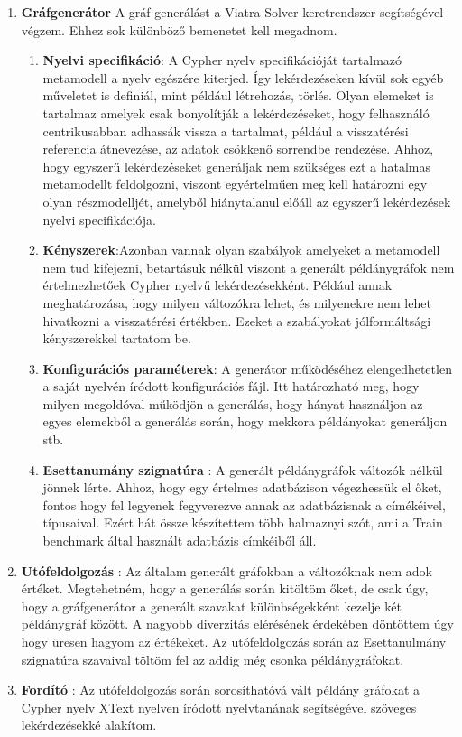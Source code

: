 \begin{enumerate}
	\item \textbf{Gráfgenerátor}
	A gráf generálást a Viatra Solver keretrendszer  segítségével végzem. Ehhez sok különböző bemenetet kell megadnom. 
	\begin{enumerate}
		\item\textbf{Nyelvi specifikáció}: A Cypher nyelv specifikációját tartalmazó metamodell a nyelv egészére kiterjed. Így lekérdezéseken kívül sok egyéb műveletet is definiál, mint például létrehozás, törlés. Olyan elemeket is tartalmaz amelyek csak bonyolítják a lekérdezéseket, hogy felhasználó centrikusabban adhassák vissza a tartalmat, például a visszatérési referencia átnevezése, az adatok csökkenő sorrendbe rendezése. Ahhoz, hogy egyszerű lekérdezéseket generáljak nem szükséges ezt a hatalmas metamodellt feldolgozni, viszont egyértelműen meg kell határozni egy olyan részmodelljét, amelyből hiánytalanul előáll az egyszerű lekérdezések nyelvi specifikációja. 
		\item\textbf{Kényszerek}:Azonban vannak	olyan szabályok amelyeket a metamodell nem tud kifejezni, betartásuk nélkül viszont a generált példánygráfok nem értelmezhetőek Cypher nyelvű lekérdezésekként. Például annak meghatározása, hogy milyen változókra lehet, és milyenekre nem lehet hivatkozni a visszatérési értékben. Ezeket a szabályokat jólformáltsági kényszerekkel tartatom be. 
		\item\textbf{Konfigurációs paraméterek}: A generátor működéséhez elengedhetetlen a saját nyelvén íródott konfigurációs fájl. Itt határozható meg, hogy milyen megoldóval működjön a generálás, hogy hányat használjon az egyes elemekből a generálás során, hogy mekkora példányokat generáljon stb.  
		\item\textbf{Esettanumány szignatúra} : A generált példánygráfok változók nélkül jönnek lérte. Ahhoz, hogy egy értelmes adatbázison végezhessük el őket, fontos hogy fel legyenek fegyverezve annak az adatbázisnak a címékéivel, típusaival. Ezért hát  össze készítettem több halmaznyi szót, ami a Train benchmark által használt adatbázis címkéiből áll. 
	\end{enumerate}
	\item \textbf{Utófeldolgozás} : Az általam generált gráfokban a változóknak nem adok értéket. Megtehetném, hogy a generálás során kitöltöm őket, de csak úgy, hogy a gráfgenerátor a generált szavakat különbségekként kezelje két példánygráf között. A nagyobb diverzitás elérésének érdekében döntöttem úgy hogy üresen hagyom az értékeket.  Az utófeldolgozás során az Esettanulmány szignatúra szavaival töltöm fel az addig még csonka példánygráfokat.    
	\item \textbf{Fordító} : Az utófeldolgozás során sorosíthatóvá vált példány gráfokat a Cypher nyelv XText nyelven íródott nyelvtanának segítségével szöveges lekérdezésekké alakítom.  
\end{enumerate}



